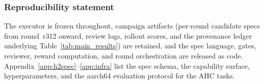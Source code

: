 \documentclass{article} %
\begin{document}
\subsubsection*{Reproducibility statement}
The executor is frozen throughout, campaign artifacts (per-round candidate
specs from round~r312 onward, review logs, rollout scores, and the provenance
ledger underlying Table~\ref{tab:main_results}) are retained, and the spec language,
gates, reviewer, reward computation, and round orchestration are released as
code.  Appendix~\ref{app:h2spec}--\ref{app:infra} list the spec schema, the
capability surface, hyperparameters, and the aarch64 evaluation protocol for
the AHC tasks.




\appendix

\end{document}
